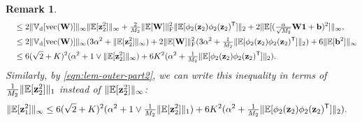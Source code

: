 \documentclass[twoside]{article}
\renewcommand{\ss}[1]{_{\text{#1}}}
\newcommand{\vb}{\mathbf{b}}
\newcommand{\vz}{\mathbf{z}}
\newcommand{\vone}{\mathbf{1}}
\newcommand{\mW}{\mathbf{W}}
\newcommand{\E}{\mathbb{E}}
\newcommand{\V}{\mathbb{V}}
\newcommand{\T}{\text{\textsf{T}}}
\renewcommand{\ss}[1]{_{\text{#1}}}        %
\DeclarePairedDelimiter\norm{\|}{\|}             %
\theoremstyle{theoremstyle}
\newtheorem{remark}[theorem]{Remark}
\begin{document}
\begin{remark}
\begin{align}
        &\quad\le
            2 \norm{\V\ss{d}[\operatorname{vec}(\mW)]}_\infty 
            \norm{\E[\vz_2^2]}_\infty 
            + \tfrac2{M_2} \norm{\E[\mW]}\ss{F}^2 
            \norm{\E[\phi_2(\vz_{2})\phi_2(\vz_{2})^\T]}_2
            + 2\norm{\E[(\tfrac{\alpha}{\sqrt{M_2}} \mW \vone + \vb)^2]}_\infty, \\
        &\quad\le
            2 \norm{\V\ss{d}[\operatorname{vec}(\mW)]}_\infty 
            (3 \alpha^2 + \norm{\E[\vz_2^2]}_\infty) 
            + 2\norm{\E[\mW]}\ss{F}^2 
            (3\alpha^2 + \tfrac1{M_2} \norm{\E[\phi_2(\vz_{2})\phi_2(\vz_{2})^\T]}_2)
            + 6 \norm{\E[\vb^2]}_\infty \\
        &\quad\le
            6 (\sqrt{2} + K)^2(\alpha^2 + 1\lor \norm{\E[\vz_2^2]}_\infty)
            + 6K^2 
            (\alpha^2 + \tfrac1{M_2} \norm{\E[\phi_2(\vz_{2})\phi_2(\vz_{2})^\T]}_2).
    \end{align}
    Similarly, by \cref{eqn:lem-outer-part2}, we can write this inequality in terms of $\tfrac1{M_2}\norm{\E[\vz_2^2]}_1$ instead of $\norm{\E[\vz_2^2]}_\infty$:
    \begin{align}
        &\norm{\E[\vz_{1}^2]}_\infty
            \le
            6 (\sqrt{2} + K)^2(\alpha^2 + 1\lor \tfrac1{M_2}\norm{\E[\vz_2^2]}_1)
            + 6K^2 
            (\alpha^2 + \tfrac1{M_2} \norm{\E[\phi_2(\vz_{2})\phi_2(\vz_{2})^\T]}_2).
    \end{align}
    
\end{remark}
\end{document}
